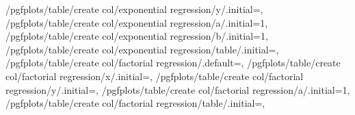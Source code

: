 {        /pgfplots/table/create col/exponential regression/y/.initial=,%
        /pgfplots/table/create col/exponential regression/a/.initial=1,%
        /pgfplots/table/create col/exponential regression/b/.initial=1,%
        /pgfplots/table/create col/exponential regression/table/.initial=,%
%
        /pgfplots/table/create col/factorial regression/.default=,%
        /pgfplots/table/create col/factorial regression/x/.initial=,%
        /pgfplots/table/create col/factorial regression/y/.initial=,%
        /pgfplots/table/create col/factorial regression/a/.initial=1,%
        /pgfplots/table/create col/factorial regression/table/.initial=,%
}
\makeatother

